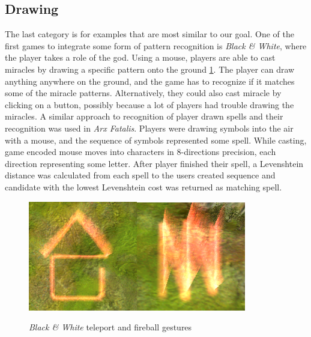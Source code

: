 \subsection{Drawing}
The last category is for examples that are most similar to our goal. One of the first games to integrate some form of pattern recognition is \emph{Black \& White}, where the player takes a role of the god. Using a mouse, players are able to cast miracles by drawing a specific pattern onto the ground \ref{fig:blackwhite}. The player can draw anything anywhere on the ground, and the game has to recognize if it matches some of the miracle patterns. Alternatively, they could also cast miracle by clicking on a button, possibly because a lot of players had trouble drawing the miracles. A similar approach to recognition of player drawn spells and their recognition was used in \emph{Arx Fatalis}. Players were drawing symbols into the air with a mouse, and the sequence of symbols represented some spell. While casting, game encoded mouse moves into characters in 8-directions precision, each direction representing some letter. After player finished their spell, a Levenshtein distance was calculated from each spell to the users created sequence and candidate with the lowest Levenshtein cost was returned as matching spell.

\begin{figure}[!htb]
\begin{center}
\label{fig:blackwhite}
\includegraphics[width=.3\linewidth]{ext/gestureteleport.png}\quad\includegraphics[width=.3\linewidth]{ext/gesturefireball.png}
\end{center}
    \centering
    \caption{\emph{Black \& White} teleport and fireball gestures}
\end{figure}

